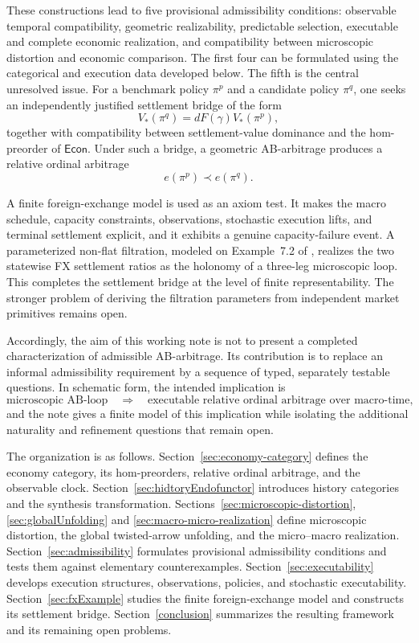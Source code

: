 \documentclass[11pt,a4paper]{article}
\newcommand{\Econ}{\mathsf{Econ}}
\begin{document}
These constructions lead to five provisional admissibility conditions:
observable temporal compatibility, geometric realizability, predictable
selection, executable and complete economic realization, and compatibility
between microscopic distortion and economic comparison.  The first four
can be formulated using the categorical and execution data developed below.
The fifth is the central unresolved issue.  For a benchmark policy \(\pi^p\)
and a candidate policy \(\pi^q\), one seeks an independently justified
settlement bridge of the form
\[
  V_*(\pi^q)=dF(\gamma)V_*(\pi^p),
\]
together with compatibility between settlement-value dominance and the
hom-preorder of \(\Econ\).  Under such a bridge, a geometric AB-arbitrage
produces a relative ordinal arbitrage
\[
  e(\pi^p)\prec e(\pi^q).
\]

A finite foreign-exchange model is used as an axiom test.  It makes the
macro schedule, capacity constraints, observations, stochastic execution
lifts, and terminal settlement explicit, and it exhibits a genuine
capacity-failure event.  A parameterized non-flat filtration, modeled on
Example~7.2 of \cite{AdachiHaraAB}, realizes the two statewise FX settlement
ratios as the holonomy of a three-leg microscopic loop.  This completes the
settlement bridge at the level of finite representability.  The stronger
problem of deriving the filtration parameters from independent market
primitives remains open.

Accordingly, the aim of this working note is not to present a completed
characterization of admissible AB-arbitrage.  Its contribution is to replace
an informal admissibility requirement by a sequence of typed, separately
testable questions.  In schematic form, the intended implication is
\[
  \text{microscopic AB-loop}
  \quad\Longrightarrow\quad
  \text{executable relative ordinal arbitrage over macro-time},
\]
and the note gives a finite model of this implication while isolating the
additional naturality and refinement questions that remain open.

The organization is as follows.
Section~\ref{sec:economy-category} defines the economy category, its
hom-preorders, relative ordinal arbitrage, and the observable clock.
Section~\ref{sec:hidtoryEndofunctor}
introduces history categories
and the synthesis transformation.  
Sections~\ref{sec:microscopic-distortion},
\ref{sec:globalUnfolding}
and  \ref{sec:macro-micro-realization}
define microscopic distortion, the global twisted-arrow unfolding, 
and the micro--macro realization.  
Section~\ref{sec:admissibility}
formulates provisional admissibility conditions and tests them against
elementary counterexamples.
Section~\ref{sec:executability}
develops execution structures, observations, policies, and stochastic executability.  
Section~\ref{sec:fxExample}
studies the finite foreign-exchange model and constructs its settlement bridge.  
Section~\ref{conclusion}
summarizes the resulting framework and its remaining open problems.
\end{document}
